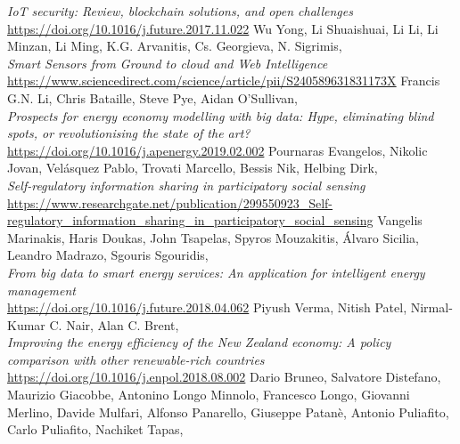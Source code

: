 \documentclass[11pt]{article}
\begin{document}
\begin{thebibliography}{22}
	\textit{IoT security: Review, blockchain solutions, and open challenges}\\
	\hyperref[https://doi.org/10.1016/j.future.2017.11.022]{https://doi.org/10.1016/j.future.2017.11.022}
	Wu Yong, Li Shuaishuai, Li Li, Li Minzan, Li Ming, K.G. Arvanitis, Cs. Georgieva, N. Sigrimis, \\
	\textit{Smart Sensors from Ground to cloud and Web Intelligence}\\
	\hyperref[https://www.sciencedirect.com/science/article/pii/S240589631831173X]{https://www.sciencedirect.com/science/article/pii/S240589631831173X}
	Francis G.N. Li, Chris Bataille, Steve Pye, Aidan O'Sullivan, \\
	\textit{Prospects for energy economy modelling with big data: Hype, eliminating blind spots, or revolutionising the state of the art?}\\
	\hyperref[https://doi.org/10.1016/j.apenergy.2019.02.002]{https://doi.org/10.1016/j.apenergy.2019.02.002}
	Pournaras Evangelos, Nikolic Jovan, Velásquez Pablo, Trovati Marcello, Bessis Nik, Helbing Dirk, \\
	\textit{Self-regulatory information sharing in participatory social sensing}\\
	\hyperref[https://www.researchgate.net/publication/299550923_Self-regulatory_information_sharing_in_participatory_social_sensing]{https://www.researchgate.net/publication/299550923\_Self-regulatory\_information\_sharing\_in\_participatory\_social\_sensing}
	Vangelis Marinakis, Haris Doukas, John Tsapelas, Spyros Mouzakitis, Álvaro Sicilia, Leandro Madrazo, Sgouris Sgouridis, \\
	\textit{From big data to smart energy services: An application for intelligent energy management}\\
	\hyperref[https://doi.org/10.1016/j.future.2018.04.062]{https://doi.org/10.1016/j.future.2018.04.062}
	Piyush Verma, Nitish Patel, Nirmal-Kumar C. Nair, Alan C. Brent, \\
	\textit{Improving the energy efficiency of the New Zealand economy: A policy comparison with other renewable-rich countries}\\
	\hyperref[https://doi.org/10.1016/j.enpol.2018.08.002]{https://doi.org/10.1016/j.enpol.2018.08.002}
	Dario Bruneo, Salvatore Distefano, Maurizio Giacobbe, Antonino Longo Minnolo, Francesco Longo, Giovanni Merlino, Davide Mulfari, Alfonso Panarello, Giuseppe Patanè, Antonio Puliafito, Carlo Puliafito, Nachiket Tapas, \\

\end{thebibliography}
\end{document}
